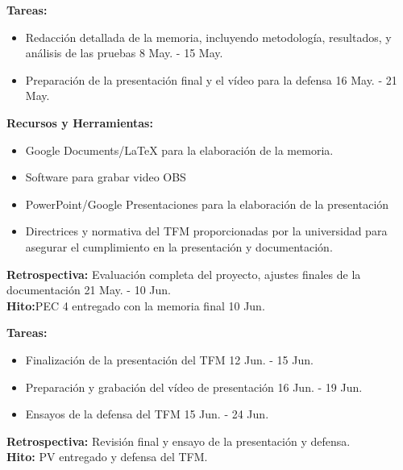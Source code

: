 \begin{tcolorbox}[phasebox, title=Fases del trabajo]
    
    \begin{tcolorbox}[sprintbox, title= Sprint 7 y 8: Documentación final y preparación de la memoria.]
        \textbf{Tareas:}
        \begin{itemize}
            \item Redacción detallada de la memoria, incluyendo metodología, resultados, y análisis de las pruebas 8 May. - 15 May.
            \item Preparación de la presentación final y el vídeo para la defensa 16 May. - 21 May.
        \end{itemize}
        
        \textbf{Recursos y Herramientas:}
        \begin{itemize}
            \item Google Documents/LaTeX para la elaboración de la memoria.
            \item Software para grabar video OBS 
            \item PowerPoint/Google Presentaciones para la elaboración de la presentación
            \item Directrices y normativa del TFM proporcionadas por la universidad para asegurar el cumplimiento en la presentación y documentación.

        \end{itemize}
        \textbf{Retrospectiva:} Evaluación completa del proyecto, ajustes finales de la documentación 21 May. - 10 Jun.\\
        \textbf{Hito:}PEC 4 entregado con la memoria final 10 Jun.

    \end{tcolorbox}
    
    \begin{tcolorbox}[sprintbox, title= Sprint 9: Preparación para la defensa.]
        \textbf{Tareas:}
        \begin{itemize}
            \item Finalización de la presentación del TFM 12 Jun. - 15 Jun.
            \item Preparación y grabación del vídeo de presentación 16 Jun. - 19 Jun.

            \item Ensayos de la defensa del TFM 15 Jun. - 24 Jun.

            
        \end{itemize}
       
        \textbf{Retrospectiva:}  Revisión final y ensayo de la presentación y defensa.\\
        \textbf{Hito:} PV entregado y defensa del TFM.

    \end{tcolorbox}

\end{tcolorbox}
\medskip

